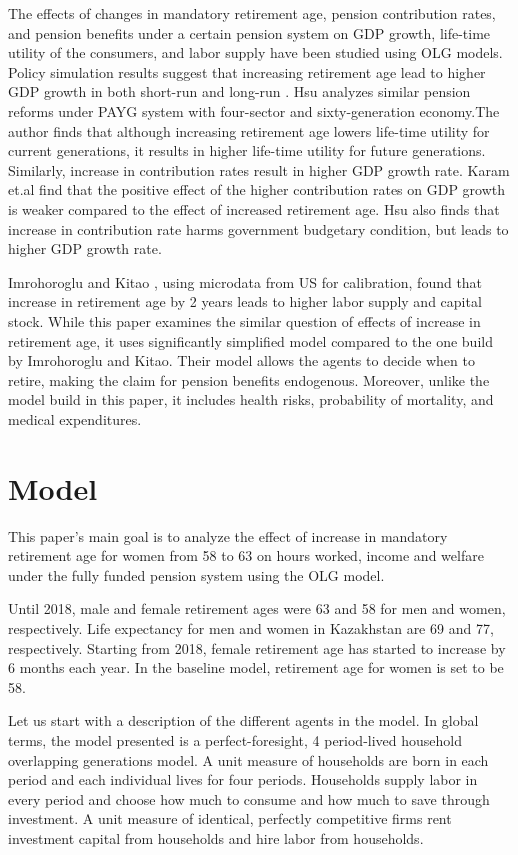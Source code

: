 \documentclass[BufferStockTheory]{subfiles}
\begin{document}
The effects of changes in mandatory retirement age, pension contribution rates, and pension benefits under a certain pension system on GDP growth, life-time utility of the consumers, and labor supply have been studied using OLG models. Policy simulation results suggest that increasing retirement age lead to higher GDP growth in both short-run and long-run \cite{cournede}.  Hsu \cite{hsu} analyzes similar pension reforms under PAYG system with four-sector and sixty-generation economy.The author finds that although increasing retirement age lowers life-time utility for current generations, it results in higher life-time utility for future generations. Similarly, increase in contribution rates result in higher GDP growth rate. Karam et.al \cite{karam} find that the positive effect of the higher contribution rates on GDP growth is weaker compared to the effect of increased retirement age. Hsu \cite{hsu} also finds that increase in contribution rate harms government budgetary condition, but leads to higher GDP growth rate.

Imrohoroglu and Kitao \cite{imroh}, using microdata from US for calibration, found that increase in retirement age by 2 years leads to higher labor supply and capital stock. While this paper examines the similar question of effects of increase in retirement age, it uses significantly simplified model compared to the one build by Imrohoroglu and Kitao. Their model allows the agents to decide when to retire, making the claim for pension benefits endogenous. Moreover, unlike the model build in this paper, it includes health risks, probability of mortality, and medical expenditures.

\hypertarget{Model}{}
\section{Model}
This paper's main goal is to analyze the effect of increase in mandatory retirement age for women from 58 to 63 on hours worked, income and welfare under the fully funded pension system using the OLG model.

Until 2018, male and female retirement ages were 63 and 58 for men and women, respectively. Life expectancy for men and women in Kazakhstan are 69 and 77, respectively. Starting from 2018, female retirement age has started to increase by 6 months each year. In the baseline model, retirement age for women is set to be 58. 

 Let us start with a description of the different agents in the model. In global terms, the model presented is a perfect-foresight, 4 period-lived household overlapping generations model. A unit measure 
 of households are born in each period and each individual lives for four periods. Households supply labor in every period and choose how much to consume and how much to save through investment. A unit measure of identical, perfectly competitive firms rent investment capital from households and hire labor from households. 
\end{document}
